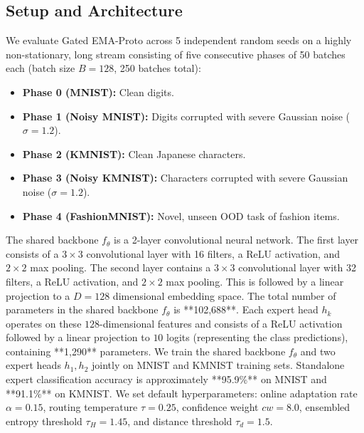 \documentclass{article}
\theoremstyle{plain}
\theoremstyle{definition}
\theoremstyle{remark}
\begin{document}
\subsection{Setup and Architecture}
We evaluate Gated EMA-Proto across 5 independent random seeds on a highly non-stationary, long stream consisting of five consecutive phases of 50 batches each (batch size $B=128$, 250 batches total):
\begin{itemize}
    \item \textbf{Phase 0 (MNIST):} Clean digits.
    \item \textbf{Phase 1 (Noisy MNIST):} Digits corrupted with severe Gaussian noise ($\sigma=1.2$).
    \item \textbf{Phase 2 (KMNIST):} Clean Japanese characters.
    \item \textbf{Phase 3 (Noisy KMNIST):} Characters corrupted with severe Gaussian noise ($\sigma=1.2$).
    \item \textbf{Phase 4 (FashionMNIST):} Novel, unseen OOD task of fashion items.
\end{itemize}
The shared backbone $f_\theta$ is a 2-layer convolutional neural network. The first layer consists of a $3\times 3$ convolutional layer with 16 filters, a ReLU activation, and $2\times 2$ max pooling. The second layer contains a $3\times 3$ convolutional layer with 32 filters, a ReLU activation, and $2\times 2$ max pooling. This is followed by a linear projection to a $D=128$ dimensional embedding space. The total number of parameters in the shared backbone $f_\theta$ is **102,688**. Each expert head $h_k$ operates on these $128$-dimensional features and consists of a ReLU activation followed by a linear projection to $10$ logits (representing the class predictions), containing **1,290** parameters. We train the shared backbone $f_\theta$ and two expert heads $h_1, h_2$ jointly on MNIST and KMNIST training sets. Standalone expert classification accuracy is approximately **95.9\%** on MNIST and **91.1\%** on KMNIST. We set default hyperparameters: online adaptation rate $\alpha=0.15$, routing temperature $\tau=0.25$, confidence weight $cw=8.0$, ensembled entropy threshold $\tau_H=1.45$, and distance threshold $\tau_d=1.5$.
\end{document}
